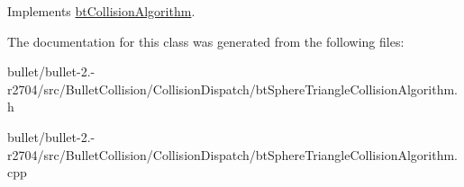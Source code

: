 Implements \hyperlink{classbt_collision_algorithm}{bt\+Collision\+Algorithm}.



The documentation for this class was generated from the following files\+:\begin{DoxyCompactItemize}
\item 
bullet/bullet-\/2.-\/r2704/src/\+Bullet\+Collision/\+Collision\+Dispatch/bt\+Sphere\+Triangle\+Collision\+Algorithm.\+h\item 
bullet/bullet-\/2.-\/r2704/src/\+Bullet\+Collision/\+Collision\+Dispatch/bt\+Sphere\+Triangle\+Collision\+Algorithm.\+cpp\end{DoxyCompactItemize}

